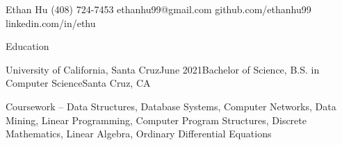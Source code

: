 \documentclass[11pt,fit=false]{cv_template}
\begin{document}

\begin{cv}

\begin{cvheader}
{Ethan Hu}
{(408) 724-7453}
{ethanhu99@gmail.com}
{github.com/ethanhu99}
{}
{linkedin.com/in/ethu}
\end{cvheader}






\begin{cvsection}{Education}


\begin{cvsubsection}
{University of California, Santa Cruz}{June 2021}{Bachelor of Science, B.S. in Computer Science}{Santa Cruz, CA}

\listitem[] Coursework -- Data Structures, Database Systems, Computer Networks, Data Mining, Linear Programming, Computer Program Structures, Discrete Mathematics, Linear Algebra, Ordinary Differential Equations

\end{cvsubsection}

\end{cvsection}



\end{cv}
\end{document}
